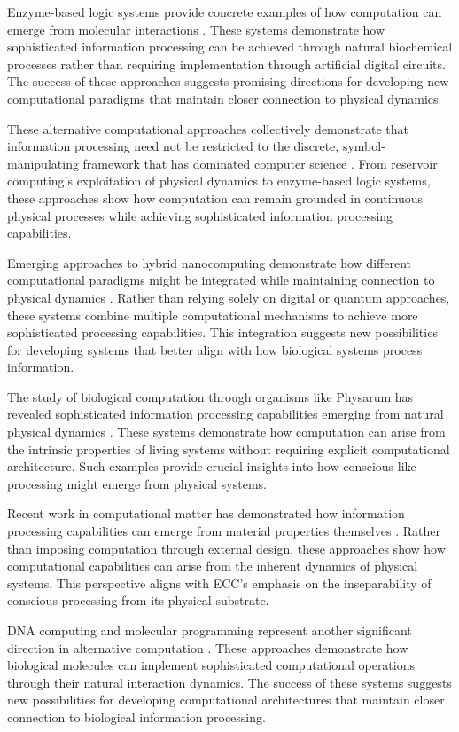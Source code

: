 Enzyme-based logic systems provide concrete examples of how computation can emerge from molecular interactions \cite{Katz2019}. These systems demonstrate how sophisticated information processing can be achieved through natural biochemical processes rather than requiring implementation through artificial digital circuits. The success of these approaches suggests promising directions for developing new computational paradigms that maintain closer connection to physical dynamics.

These alternative computational approaches collectively demonstrate that information processing need not be restricted to the discrete, symbol-manipulating framework that has dominated computer science \cite{Levin2018}. From reservoir computing's exploitation of physical dynamics to enzyme-based logic systems, these approaches show how computation can remain grounded in continuous physical processes while achieving sophisticated information processing capabilities.

Emerging approaches to hybrid nanocomputing demonstrate how different computational paradigms might be integrated while maintaining connection to physical dynamics \cite{Mayne2019}. Rather than relying solely on digital or quantum approaches, these systems combine multiple computational mechanisms to achieve more sophisticated processing capabilities. This integration suggests new possibilities for developing systems that better align with how biological systems process information.

The study of biological computation through organisms like Physarum has revealed sophisticated information processing capabilities emerging from natural physical dynamics \cite{Nakagaki2020}. These systems demonstrate how computation can arise from the intrinsic properties of living systems without requiring explicit computational architecture. Such examples provide crucial insights into how conscious-like processing might emerge from physical systems.

Recent work in computational matter has demonstrated how information processing capabilities can emerge from material properties themselves \cite{Stepney2018}. Rather than imposing computation through external design, these approaches show how computational capabilities can arise from the inherent dynamics of physical systems. This perspective aligns with ECC's emphasis on the inseparability of conscious processing from its physical substrate.

DNA computing and molecular programming represent another significant direction in alternative computation \cite{Tanaka2021}. These approaches demonstrate how biological molecules can implement sophisticated computational operations through their natural interaction dynamics. The success of these systems suggests new possibilities for developing computational architectures that maintain closer connection to biological information processing.

